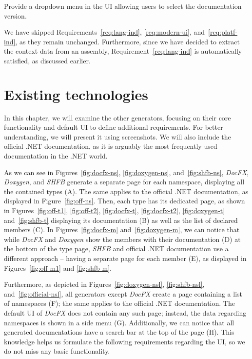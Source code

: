 \begin{subrequirement}
    Provide a dropdown menu in the UI allowing users to select the documentation version.
    \label{req:doc-version-dropdown}
\end{subrequirement}

We have skipped Requirements~\ref{req:lang-ind}, \ref{req:modern-ui}, and~\ref{req:platf-ind}, as they remain unchanged.
Furthermore, since we have decided to extract the context data from an assembly, Requirement~\ref{req:lang-ind} is automatically satisfied, as discussed earlier.

\section{Existing technologies}
\label{sec:analysis-existing-tech}

In this chapter, we will examine the other generators, focusing on their core functionality and default UI to define additional requirements.
For better understanding, we will present it using screenshots.
We will also include the official .NET documentation, as it is arguably the most frequently used documentation in the .NET world.

As we can see in Figures~\ref{fig:docfx-ns}, \ref{fig:doxygen-ns}, and~\ref{fig:shfb-ns}, \textit{DocFX}, \textit{Doxygen}, and \textit{SHFB} generate a separate page for each namespace,
displaying all the contained types (A). 
The same applies to the official .NET documentation, as displayed in Figure~\ref{fig:off-ns}.
Then, each type has its dedicated page, as shown in Figures~\ref{fig:off-t1}, \ref{fig:off-t2}, \ref{fig:docfx-t}, \ref{fig:docfx-t2}, \ref{fig:doxygen-t} and~\ref{fig:shfb-t} displaying its documentation (B) as well as the list of declared members (C).
In Figures~\ref{fig:docfx-m} and~\ref{fig:doxygen-m}, we can notice that while \textit{DocFX} and \textit{Doxygen} show the members with their documentation (D) at the bottom of the type page,
\textit{SHFB} and official .NET documentation use a different approach -- having a separate page for each member (E), as displayed in Figures~\ref{fig:off-m1} and \ref{fig:shfb-m}.

Furthermore, as depicted in Figures~\ref{fig:doxygen-nsl}, \ref{fig:shfb-nsl}, and~\ref{fig:official-nsl}, all generators except \textit{DocFX} create a page containing a list of namespaces (F); the same applies to the official .NET documentation.
The default UI of \textit{DocFX} does not contain any such page; instead, the data regarding namespaces is shown in a side menu (G).
Additionally, we can notice that all generated documentations have a search bar at the top of the page (H).
This knowledge helps us formulate the following requirements regarding the UI, so we do not miss any basic functionality.

